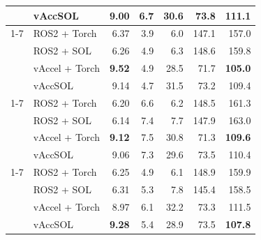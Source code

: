 \begin{table}[t]
\begin{tabular}{llrrrrr}
 & vAccSOL & 9.00 & 6.7 & 30.6 & 73.8 & 111.1 \\
\cmidrule(lr){1-7}
\multirow{4}{*}{FCN-R50} & ROS2 + Torch & 6.37 & 3.9 & 6.0 & 147.1 & 157.0 \\
 & ROS2 + SOL & 6.26 & 4.9 & 6.3 & 148.6 & 159.8 \\
 & vAccel + Torch & \textbf{9.52} & 4.9 & 28.5 & 71.7 & \textbf{105.0} \\
 & vAccSOL & 9.14 & 4.7 & 31.5 & 73.2 & 109.4 \\
\cmidrule(lr){1-7}
\multirow{4}{*}{DLv3-R101} & ROS2 + Torch & 6.20 & 6.6 & 6.2 & 148.5 & 161.3 \\
 & ROS2 + SOL & 6.14 & 7.4 & 7.7 & 147.9 & 163.0 \\
 & vAccel + Torch & \textbf{9.12} & 7.5 & 30.8 & 71.3 & \textbf{109.6} \\
 & vAccSOL & 9.06 & 7.3 & 29.6 & 73.5 & 110.4 \\
\cmidrule(lr){1-7}
\multirow{4}{*}{DLv3-R50} & ROS2 + Torch & 6.25 & 4.9 & 6.1 & 148.9 & 159.9 \\
 & ROS2 + SOL & 6.31 & 5.3 & 7.8 & 145.4 & 158.5 \\
 & vAccel + Torch & 8.97 & 6.1 & 32.2 & 73.3 & 111.5 \\
 & vAccSOL & \textbf{9.28} & 5.4 & 28.9 & 73.5 & \textbf{107.8} \\
\bottomrule
\end{tabular}
\end{table}
